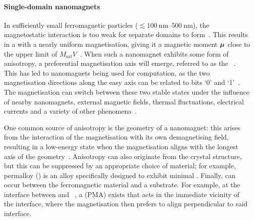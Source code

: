 \paragraph{Single-domain nanomagnets}
In sufficiently small ferromagnetic particles ($\lesssim \SIrange{100}{500}{\nano\metre}$), the magnetostatic interaction is too weak for separate domains to form~\cite{Kittel_TheoryFMDomains,BrownThermalFluctuations}.
This results in a  with a nearly uniform magnetisation, giving it a magnetic moment $\boldsymbol{\mathbf{\mu}}$ close to the upper limit of $M_\mathrm{sat}V$~\cite{FRENKEL1930,neel1949theorie}. %
When such a nanomagnet exhibits some form of anisotropy, a preferential magnetisation axis will emerge, referred to as the ~\cite{nisoli2013colloquium}.
This has led to nanomagnets being used for computation, as the two magnetisation directions along the easy axis can be related to bits `0' and `1'~\cite{MQCA_RoomTemp,NML_Carlton,Gypens_Balanced,Gypens_SelfOrganizing,JM_Masterproef}.
The magnetisation can switch between these two stable states under the influence of nearby nanomagnets, external magnetic fields, thermal fluctuations, electrical currents and a variety of other phenomena~\cite{SwitchingForced_EnergyEfficient,BrownThermalFluctuations,neel1949theorie}. \par
One common source of anisotropy is the geometry of a nanomagnet: this  arises from the interaction of the magnetisation with its own demagnetising field, resulting in a low-energy state when the magnetisation aligns with the longest axis of the geometry~\cite{MagneticCharge}.
Anisotropy can also originate from the crystal structure, but this can be suppressed by an appropriate choice of material; for example, permalloy () is an alloy specifically designed to exhibit minimal .
Finally,  can occur between the ferromagnetic material and a substrate.
For example, at the interface between  and ~\cite{PMA_PdCo_PtCo}, a  (PMA) exists that acts in the immediate vicinity of the interface, where the magnetisation then prefers to align perpendicular to said interface.

